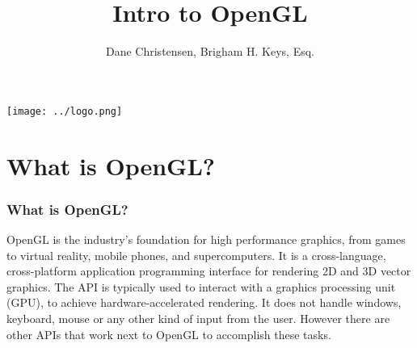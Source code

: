 \documentclass{beamer}
\title[Hello Triangle]{Intro to OpenGL}
\author{Dane Christensen, Brigham H. Keys, Esq.}
\institute[BYU-I]
          {
            BYU-Idaho \\
            \medskip
            \textit{key13005@byui.edu}
          }
\begin{document}
          \begin{frame}
            \titlepage
            \texttt{[image: ../logo.png]}
          \end{frame}



          \section{What is OpenGL?}

          \begin{frame}
            \frametitle{What is OpenGL?}
            OpenGL is the industry's foundation for high performance graphics, from games to virtual reality, mobile phones, and supercomputers. It is a cross-language, cross-platform application programming interface for rendering 2D and 3D vector graphics. The API is typically used to interact with a graphics processing unit (GPU), to achieve hardware-accelerated rendering. It does not handle windows, keyboard, mouse or any other kind of input from the user. However there are other APIs that work next to OpenGL to accomplish these tasks.
          \end{frame}

\end{document}
